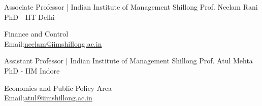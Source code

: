 


\begin{cventries}


\cventry
{Associate Professor | Indian Institute of Management Shillong} %
{Prof. Neelam Rani}  %
{PhD - IIT Delhi} %
{} %
{ %
\begin{cvitems}
{Finance and Control\\
Email:{\href{neelam@iimshillong.ac.in}{\space\color{blue}neelam@iimshillong.ac.in}}}
\end{cvitems}
}

\cventry
{Assistant Professor | Indian Institute of Management Shillong} %
{Prof. Atul Mehta}  %
{PhD - IIM Indore} %
{} %
{ %
\begin{cvitems}
{Economics and Public Policy Area\\
Email:{\href{atul@iimshillong.ac.in}{\space\color{blue}atul@iimshillong.ac.in}}}
\end{cvitems}
}
\end{cventries}
